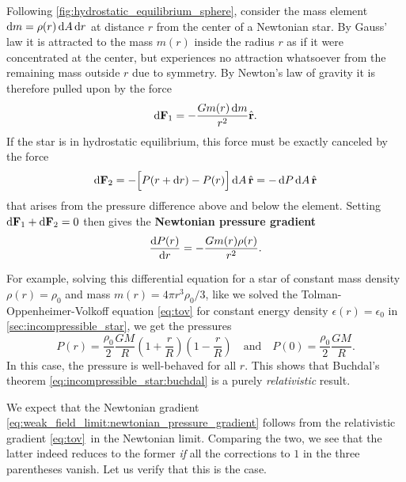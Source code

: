 Following \cref{fig:hydrostatic_equilibrium_sphere}, consider the mass element $\mathop{}\!\mathrm{d} m = \rho(r) \mathop{}\!\mathrm{d} A \mathop{}\!\mathrm{d} r$ at distance $r$ from the center of a Newtonian star.
By Gauss' law it is attracted to the mass $m(r)$ inside the radius $r$ as if it were concentrated at the center, but experiences no attraction whatsoever from the remaining mass outside $r$ due to symmetry.
By Newton's law of gravity it is therefore pulled upon by the force
\begin{equation}
	\mathop{}\!\mathrm{d} \mathbf{F}_1 = -\frac{G m(r) \mathop{}\!\mathrm{d} m}{r^2} \hat{\textbf{r}} .
	\label{eq:weak_field_limit:force_newton}
\end{equation}
If the star is in hydrostatic equilibrium, this force must be exactly canceled by the force
\begin{equation}
	\mathop{}\!\mathrm{d} \textbf{F}_2 = - \Big[ P(r + \mathop{}\!\mathrm{d} r) - P(r) \Big] \mathop{}\!\mathrm{d} A \, \hat{\textbf{r}} = -\mathop{}\!\mathrm{d} P \mathop{}\!\mathrm{d} A \, \hat{\textbf{r}}
	\label{eq:weak_field_limit:force_pressure}
\end{equation}
that arises from the pressure difference above and below the element.
Setting $\mathop{}\!\mathrm{d} \textbf{F}_1 + \mathop{}\!\mathrm{d} \textbf{F}_2 = 0$ then gives the \textbf{Newtonian pressure gradient}
\begin{equation}
	\odv{P(r)}{r} = -\frac{G m(r) \rho(r)}{r^2} .
	\label{eq:weak_field_limit:newtonian_pressure_gradient}
\end{equation}

For example, solving this differential equation for a star of constant mass density $\rho(r) = \rho_0$ and mass $m(r) = 4 \pi r^3 \rho_0 / 3$, like we solved the Tolman-Oppenheimer-Volkoff equation \eqref{eq:tov} for constant energy density $\epsilon(r) = \epsilon_0$ in \cref{sec:incompressible_star}, we get the pressures
\begin{equation}
	P(r) = \frac{\rho_0}{2} \frac{G M}{R} \left( 1 + \frac{r}{R} \right) \left( 1 - \frac{r}{R} \right)
	\quad \text{and} \quad
	P(0) = \frac{\rho_0}{2} \frac{GM}{R} .
	\label{eq:weak_field_limit:newtonian_pressure}
\end{equation}
In this case, the pressure is well-behaved for all $r$.
This shows that Buchdal's theorem \eqref{eq:incompressible_star:buchdal} is a purely \emph{relativistic} result.


We expect that the Newtonian gradient \eqref{eq:weak_field_limit:newtonian_pressure_gradient} follows from the relativistic gradient \eqref{eq:tov} in the Newtonian limit.
Comparing the two, we see that the latter indeed reduces to the former \emph{if} all the corrections to $1$ in the three parentheses vanish.
Let us verify that this is the case.

